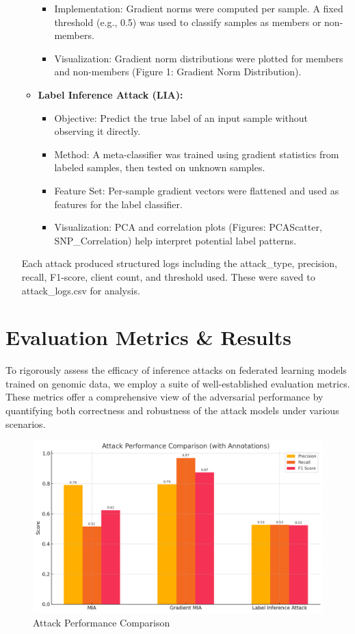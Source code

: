 \documentclass[conference]{IEEEtran}
\begin{document}
\begin{enumerate}
\begin{itemize}
\begin{itemize}
            \item Implementation: Gradient norms were computed per sample. A fixed threshold (e.g., 0.5) was used to classify samples as members or non-members.
            \item Visualization: Gradient norm distributions were plotted for members and non-members (Figure 1: Gradient Norm Distribution).
        \end{itemize}
        \item \textbf{Label Inference Attack (LIA):}
        \begin{itemize}
            \item Objective: Predict the true label of an input sample without observing it directly.
            \item Method: A meta-classifier was trained using gradient statistics from labeled samples, then tested on unknown samples.
            \item Feature Set: Per-sample gradient vectors were flattened and used as features for the label classifier.
            \item Visualization: PCA and correlation plots (Figures: PCAScatter, SNP\_Correlation) help interpret potential label patterns.
        \end{itemize}
    \end{itemize}
    Each attack produced structured logs including the attack\_type, precision, recall, F1-score, client count, and threshold used. These were saved to attack\_logs.csv for analysis.
\end{enumerate}

\section{Evaluation Metrics \& Results}
To rigorously assess the efficacy of inference attacks on federated learning models trained on genomic data, we employ a suite of well-established evaluation metrics. These metrics offer a comprehensive view of the adversarial performance by quantifying both correctness and robustness of the attack models under various scenarios.
\begin{figure}[H]
    \centering
    \includegraphics[width=\linewidth]{Attack_Performance_Comparison.png}
    \caption{Attack Performance Comparison}
\end{figure}
\end{document}
